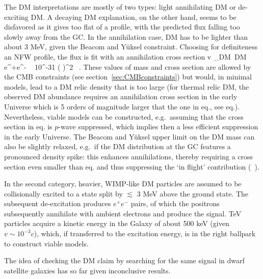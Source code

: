 The DM interpretations are mostly of two types:
light annihilating DM or de-exciting DM. A decaying DM explanation, on the other hand, seems to be disfavored as it gives too flat of a profile, with the predicted flux falling too slowly away from the GC. In the annihilation case, DM has to be lighter than about 3 MeV, given the Beacom and Y\"uksel constraint. Choosing for definiteness an NFW profile, the flux is fit with an annihilation cross section 
\beq \label{eq:sigmav511}
\langle \sigma v \rangle_{{\rm DM}\, {\rm DM} \to e^+e^-}  ~ 10^{-31} \left( \right)^2 \, .\eeq
These values of mass and cross section are allowed by the CMB constraints (see section~\ref{sec:CMBconstraints}) 
but would, in minimal models, lead to a DM relic density that is too large (for thermal relic DM, the observed DM abundance requires an annihilation cross section in the early Universe which is 5 orders of magnitude larger that the one in eq., see eq.). 
Nevertheless, viable models can be constructed, e.g.~assuming that the cross section in eq. is $p$-wave suppressed, which implies then a less efficient suppression in the early Universe. 
The Beacom and Y\"uksel upper limit on the DM mass can also be slightly relaxed, e.g.~if the DM distribution at the GC features a pronounced density spike: this enhances annihilations, thereby requiring a cross section even smaller than eq. and thus suppressing the `in flight' contribution (~\cite{511KeVline}).

In the second category, heavier, WIMP-like DM particles are assumed to be collisionally excited to a state split by $\lesssim$ 3 MeV above the ground state. The subsequent de-excitation produces $e^+e^-$ pairs, of which the positrons subsequently annihilate with ambient electrons and produce the signal. TeV particles acquire a kinetic energy in the Galaxy of about 500 keV (given $v \sim 10^{-3} c$), which, if transferred to the excitation energy, is in the right ballpark to construct viable models.

\smallskip

The idea of checking the DM claim by searching for the same signal in dwarf satellite galaxies has so far given inconclusive results.




